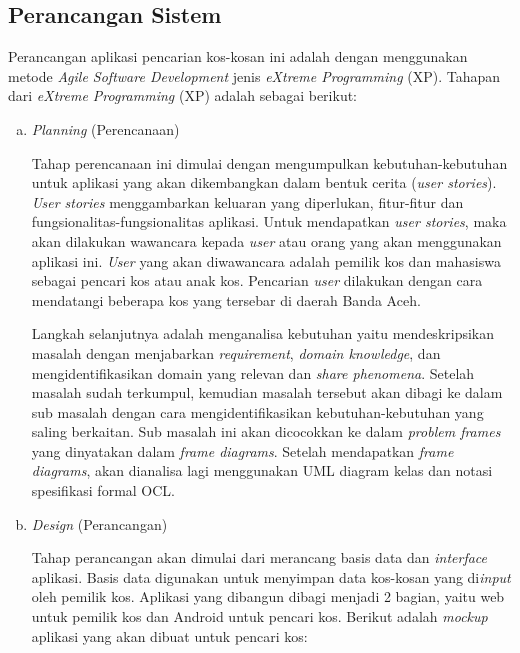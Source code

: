 \subsection{Perancangan Sistem}
Perancangan aplikasi pencarian kos-kosan ini adalah dengan menggunakan metode \textit{Agile Software Development} jenis \textit{eXtreme Programming} (XP). Tahapan dari \textit{eXtreme Programming} (XP) adalah sebagai berikut:

\begin{enumerate}[a.]
\item \textit{Planning} (Perencanaan)

Tahap perencanaan ini dimulai dengan mengumpulkan kebutuhan-kebutuhan untuk aplikasi yang akan dikembangkan dalam bentuk cerita (\textit{user stories}). \textit{User stories} menggambarkan keluaran yang diperlukan, fitur-fitur dan fungsionalitas-fungsionalitas aplikasi.  Untuk mendapatkan \textit{user stories}, maka akan dilakukan wawancara kepada \textit{user} atau orang yang akan menggunakan aplikasi ini. \textit{User} yang akan diwawancara adalah pemilik kos dan mahasiswa sebagai pencari kos atau anak kos. Pencarian \textit{user} dilakukan dengan cara mendatangi beberapa kos yang tersebar di daerah Banda Aceh. 
	
Langkah selanjutnya adalah menganalisa kebutuhan yaitu mendeskripsikan masalah dengan menjabarkan \textit{requirement}, \textit{domain knowledge}, dan mengidentifikasikan domain yang relevan dan \textit{share phenomena}. Setelah masalah sudah terkumpul, kemudian masalah tersebut akan dibagi ke dalam sub masalah dengan cara mengidentifikasikan kebutuhan-kebutuhan yang saling berkaitan. Sub masalah ini akan dicocokkan ke dalam \textit{problem frames} yang dinyatakan dalam \textit{frame diagrams}. Setelah mendapatkan \textit{frame diagrams}, akan dianalisa lagi menggunakan UML diagram kelas dan notasi spesifikasi formal OCL.
	
\item \textit{Design} (Perancangan)
	
Tahap perancangan akan dimulai dari merancang basis data dan \textit{interface} aplikasi. Basis data digunakan untuk menyimpan data kos-kosan yang di\textit{input} oleh pemilik kos. Aplikasi yang dibangun dibagi menjadi 2 bagian, yaitu web untuk pemilik kos dan Android untuk pencari kos. Berikut adalah \textit{mockup} aplikasi yang akan dibuat untuk pencari kos:
	

\end{enumerate}
